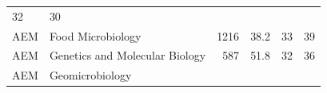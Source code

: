 \documentclass[11pt,]{article}
\begin{document}
\begin{longtable}[]{@{}llrrrr@{}}
\begin{minipage}[t]{0.11\columnwidth}
32\strut
\end{minipage} & \begin{minipage}[t]{0.11\columnwidth}\raggedleft\strut
30\strut
\end{minipage}\tabularnewline
\begin{minipage}[t]{0.06\columnwidth}\raggedright\strut
AEM\strut
\end{minipage} & \begin{minipage}[t]{0.43\columnwidth}\raggedright\strut
Food Microbiology\strut
\end{minipage} & \begin{minipage}[t]{0.04\columnwidth}\raggedleft\strut
1216\strut
\end{minipage} & \begin{minipage}[t]{0.08\columnwidth}\raggedleft\strut
38.2\strut
\end{minipage} & \begin{minipage}[t]{0.11\columnwidth}\raggedleft\strut
33\strut
\end{minipage} & \begin{minipage}[t]{0.11\columnwidth}\raggedleft\strut
39\strut
\end{minipage}\tabularnewline
\begin{minipage}[t]{0.06\columnwidth}\raggedright\strut
AEM\strut
\end{minipage} & \begin{minipage}[t]{0.43\columnwidth}\raggedright\strut
Genetics and Molecular Biology\strut
\end{minipage} & \begin{minipage}[t]{0.04\columnwidth}\raggedleft\strut
587\strut
\end{minipage} & \begin{minipage}[t]{0.08\columnwidth}\raggedleft\strut
51.8\strut
\end{minipage} & \begin{minipage}[t]{0.11\columnwidth}\raggedleft\strut
32\strut
\end{minipage} & \begin{minipage}[t]{0.11\columnwidth}\raggedleft\strut
36\strut
\end{minipage}\tabularnewline
\begin{minipage}[t]{0.06\columnwidth}\raggedright\strut
AEM\strut
\end{minipage} & \begin{minipage}[t]{0.43\columnwidth}\raggedright\strut
Geomicrobiology\strut
\end{minipage} & \begin{minipage}[t]{0.04\columnwidth}\raggedleft\strut

\end{minipage}
\end{longtable}
\end{document}
